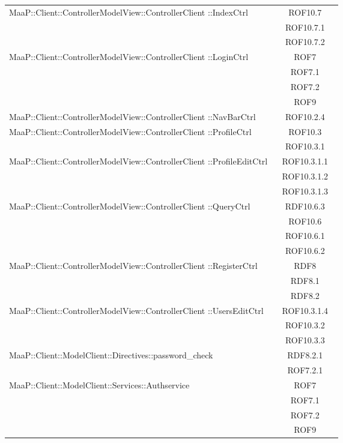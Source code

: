 \begin{center}
\begin{longtable}{|p{0.8\linewidth}|c|}
\midrule
MaaP::Client::ControllerModelView::ControllerClient ::IndexCtrl
& ROF10.7\\
& ROF10.7.1\\
& ROF10.7.2\\

\midrule
MaaP::Client::ControllerModelView::ControllerClient ::LoginCtrl
& ROF7\\
& ROF7.1\\
& ROF7.2\\
& ROF9\\

\midrule
MaaP::Client::ControllerModelView::ControllerClient ::NavBarCtrl
& ROF10.2.4\\

\midrule
MaaP::Client::ControllerModelView::ControllerClient ::ProfileCtrl
& ROF10.3\\
& ROF10.3.1\\

\midrule
MaaP::Client::ControllerModelView::ControllerClient ::ProfileEditCtrl
& ROF10.3.1.1\\
& ROF10.3.1.2\\
& ROF10.3.1.3\\

\midrule
MaaP::Client::ControllerModelView::ControllerClient ::QueryCtrl
& RDF10.6.3\\
& ROF10.6\\
& ROF10.6.1\\
& ROF10.6.2\\

\midrule
MaaP::Client::ControllerModelView::ControllerClient ::RegisterCtrl
& RDF8\\
& RDF8.1\\
& RDF8.2\\

\midrule
MaaP::Client::ControllerModelView::ControllerClient ::UsersEditCtrl
& ROF10.3.1.4\\
& ROF10.3.2\\
& ROF10.3.3\\

\midrule
MaaP::Client::ModelClient::Directives::password\_check
& RDF8.2.1\\
& ROF7.2.1\\

\midrule
MaaP::Client::ModelClient::Services::Authservice
& ROF7\\
& ROF7.1\\
& ROF7.2\\
& ROF9\\


\end{longtable}
\end{center}
